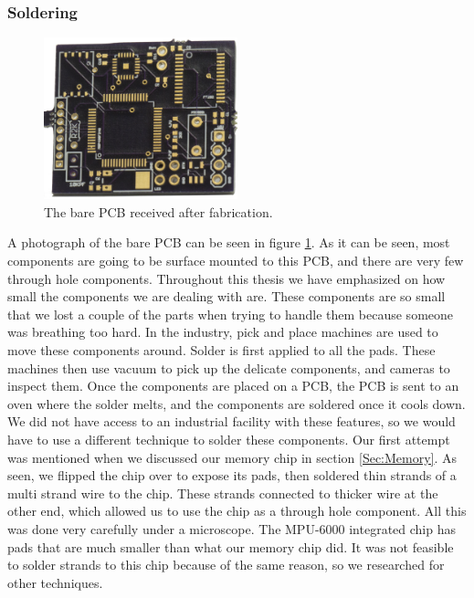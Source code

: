 \subsubsection{Soldering}
\label{Sec:Soldering}
\begin{figure}
\begin{center}
\includegraphics[width=0.5\textwidth]{images/BarePCB.jpg}
\caption{The bare PCB received after fabrication.}
\label{Fig:PCBBare}
\end{center}
\end{figure}
A photograph of the bare PCB can be seen in figure \ref{Fig:PCBBare}.
As it can be seen,
most components are going to be surface mounted to this PCB,
and there are very few through hole components.
Throughout this thesis we have emphasized on how small the components we are dealing with are.
These components are so small that we lost a couple of the parts when trying to handle them because someone was breathing too hard.
In the industry,
pick and place machines are used to move these components around.
Solder is first applied to all the pads.
These machines then use vacuum to pick up the delicate components,
and cameras to inspect them. 
Once the components are placed on a PCB,
the PCB is sent to an oven where the solder melts,
and the components are soldered once it cools down.
We did not have access to an industrial facility with these features,
so we would have to use a different technique to solder these components.
Our first attempt was mentioned when we discussed our memory chip in section \ref{Sec:Memory}.
As seen, we flipped the chip over to expose its pads,
then soldered thin strands of a multi strand wire to the chip.
These strands connected to thicker wire at the other end,
which allowed us to use the chip as a through hole component.
All this was done very carefully under a microscope.
The MPU-6000 integrated chip has pads that are much smaller than what our memory chip did.
It was not feasible to solder strands to this chip because of the same reason,
so we researched for other techniques.

